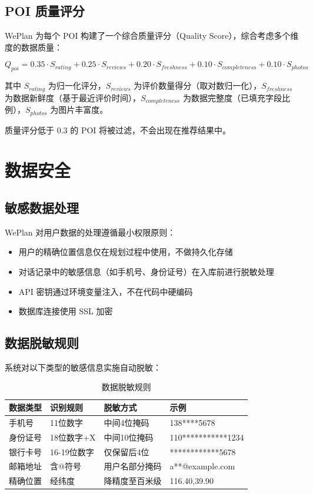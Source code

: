 \documentclass[12pt,a4paper]{ctexart}
\begin{document}
\subsection{POI 质量评分}

WePlan 为每个 POI 构建了一个综合质量评分（Quality Score），综合考虑多个维度的数据质量：

\begin{equation}
Q_{poi} = 0.35 \cdot S_{rating} + 0.25 \cdot S_{reviews} + 0.20 \cdot S_{freshness} + 0.10 \cdot S_{completeness} + 0.10 \cdot S_{photos}
\end{equation}

其中 $S_{rating}$ 为归一化评分，$S_{reviews}$ 为评价数量得分（取对数归一化），$S_{freshness}$ 为数据新鲜度（基于最近评价时间），$S_{completeness}$ 为数据完整度（已填充字段比例），$S_{photos}$ 为图片丰富度。

质量评分低于 0.3 的 POI 将被过滤，不会出现在推荐结果中。

\section{数据安全}

\subsection{敏感数据处理}

WePlan 对用户数据的处理遵循最小权限原则：

\begin{itemize}[leftmargin=2em]
  \item 用户的精确位置信息仅在规划过程中使用，不做持久化存储
  \item 对话记录中的敏感信息（如手机号、身份证号）在入库前进行脱敏处理
  \item API 密钥通过环境变量注入，不在代码中硬编码
  \item 数据库连接使用 SSL 加密
\end{itemize}

\subsection{数据脱敏规则}

系统对以下类型的敏感信息实施自动脱敏：

\begin{table}[H]
\centering
\caption{数据脱敏规则}
\label{tab:desensitize}
\renewcommand{\arraystretch}{1.3}
{\small
\begin{tabular}{p{3cm} p{3.5cm} p{3cm} p{3cm}}
\toprule
\textbf{数据类型} & \textbf{识别规则} & \textbf{脱敏方式} & \textbf{示例} \\
\midrule
手机号 & 11位数字 & 中间4位掩码 & 138****5678 \\
身份证号 & 18位数字+X & 中间10位掩码 & 110***********1234 \\
银行卡号 & 16-19位数字 & 仅保留后4位 & ************5678 \\
邮箱地址 & 含@符号 & 用户名部分掩码 & a**@example.com \\
精确位置 & 经纬度 & 降精度至百米级 & 116.40,39.90 \\
\bottomrule
\end{tabular}
}
\end{table}
\end{document}
